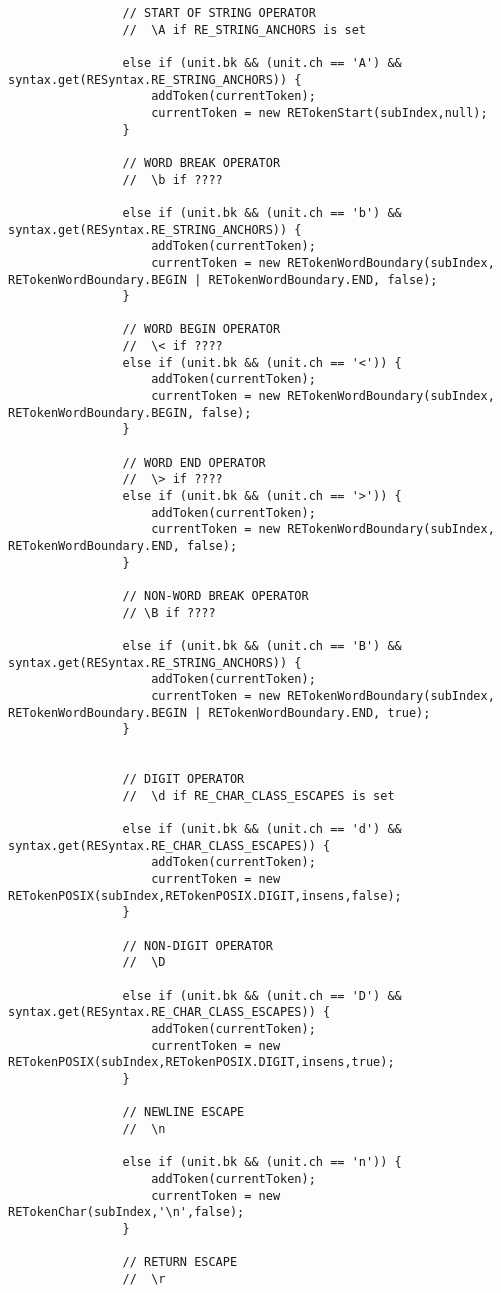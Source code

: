 \begin{mdframed}
\begin{lstlisting}
				// START OF STRING OPERATOR
				//  \A if RE_STRING_ANCHORS is set
				
				else if (unit.bk && (unit.ch == 'A') && syntax.get(RESyntax.RE_STRING_ANCHORS)) {
					addToken(currentToken);
					currentToken = new RETokenStart(subIndex,null);
				}
				
				// WORD BREAK OPERATOR
				//  \b if ????
				
				else if (unit.bk && (unit.ch == 'b') && syntax.get(RESyntax.RE_STRING_ANCHORS)) {
					addToken(currentToken);
					currentToken = new RETokenWordBoundary(subIndex, RETokenWordBoundary.BEGIN | RETokenWordBoundary.END, false);
				} 
				
				// WORD BEGIN OPERATOR 
				//  \< if ????
				else if (unit.bk && (unit.ch == '<')) {
					addToken(currentToken);
					currentToken = new RETokenWordBoundary(subIndex, RETokenWordBoundary.BEGIN, false);
				} 
				
				// WORD END OPERATOR 
				//  \> if ????
				else if (unit.bk && (unit.ch == '>')) {
					addToken(currentToken);
					currentToken = new RETokenWordBoundary(subIndex, RETokenWordBoundary.END, false);
				} 
				
				// NON-WORD BREAK OPERATOR
				// \B if ????
				
				else if (unit.bk && (unit.ch == 'B') && syntax.get(RESyntax.RE_STRING_ANCHORS)) {
					addToken(currentToken);
					currentToken = new RETokenWordBoundary(subIndex, RETokenWordBoundary.BEGIN | RETokenWordBoundary.END, true);
				} 
				
				
				// DIGIT OPERATOR
				//  \d if RE_CHAR_CLASS_ESCAPES is set
				
				else if (unit.bk && (unit.ch == 'd') && syntax.get(RESyntax.RE_CHAR_CLASS_ESCAPES)) {
					addToken(currentToken);
					currentToken = new RETokenPOSIX(subIndex,RETokenPOSIX.DIGIT,insens,false);
				}
				
				// NON-DIGIT OPERATOR
				//  \D
				
				else if (unit.bk && (unit.ch == 'D') && syntax.get(RESyntax.RE_CHAR_CLASS_ESCAPES)) {
					addToken(currentToken);
					currentToken = new RETokenPOSIX(subIndex,RETokenPOSIX.DIGIT,insens,true);
				}
				
				// NEWLINE ESCAPE
				//  \n
				
				else if (unit.bk && (unit.ch == 'n')) {
					addToken(currentToken);
					currentToken = new RETokenChar(subIndex,'\n',false);
				}
				
				// RETURN ESCAPE
				//  \r
				

\end{lstlisting}
\end{mdframed}
